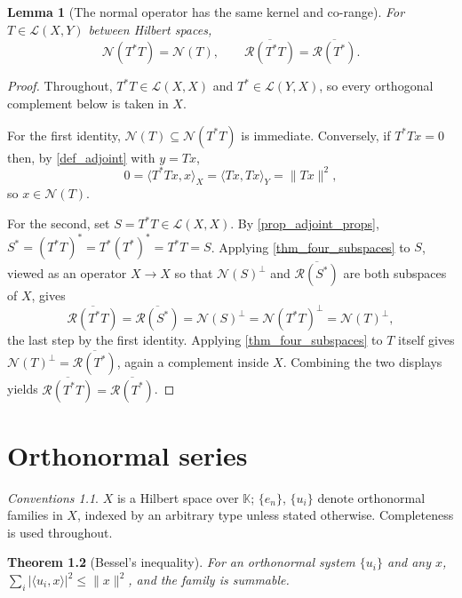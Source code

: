 \documentclass[a4paper]{report}
\theoremstyle{plain}
\newtheorem{theorem}{Theorem}[chapter]
\newtheorem{lemma}[theorem]{Lemma}
\theoremstyle{definition}
\theoremstyle{remark}
\newtheorem{assumptions}[theorem]{Conventions}
\begin{document}
\begin{lemma}[The normal operator has the same kernel and co-range]
  \label{lem_kernel_normal}
  For $T \in \mathcal{L}(X,Y)$ between Hilbert spaces,
  \[
    \mathcal{N}(T^*T) = \mathcal{N}(T),
    \qquad
    \overline{\mathcal{R}(T^*T)} = \overline{\mathcal{R}(T^*)} .
  \]
\end{lemma}
\begin{proof}
  Throughout, $T^*T \in \mathcal{L}(X,X)$ and $T^* \in \mathcal{L}(Y,X)$, so every
  orthogonal complement below is taken in $X$.

  For the first identity, $\mathcal{N}(T) \subseteq \mathcal{N}(T^*T)$ is immediate.
  Conversely, if $T^*Tx = 0$ then, by \cref{def_adjoint} with $y = Tx$,
  \[
    0 = \langle T^*Tx, x\rangle_X = \langle Tx, Tx\rangle_Y = \|Tx\|^2 ,
  \]
  so $x \in \mathcal{N}(T)$.

  For the second, set $S = T^*T \in \mathcal{L}(X,X)$.  By \cref{prop_adjoint_props},
  $S^* = (T^*T)^* = T^*(T^*)^* = T^*T = S$.  Applying \cref{thm_four_subspaces} to $S$,
  viewed as an operator $X \to X$ so that $\mathcal{N}(S)^\perp$ and
  $\overline{\mathcal{R}(S^*)}$ are both subspaces of $X$, gives
  \[
    \overline{\mathcal{R}(T^*T)} = \overline{\mathcal{R}(S^*)}
      = \mathcal{N}(S)^\perp = \mathcal{N}(T^*T)^\perp = \mathcal{N}(T)^\perp ,
  \]
  the last step by the first identity.  Applying \cref{thm_four_subspaces} to $T$ itself
  gives $\mathcal{N}(T)^\perp = \overline{\mathcal{R}(T^*)}$, again a complement inside
  $X$.  Combining the two displays yields
  $\overline{\mathcal{R}(T^*T)} = \overline{\mathcal{R}(T^*)}$.
\end{proof}



\chapter{Orthonormal series}
\label{ch_04_orthonormal_series}

\begin{assumptions}
  \label{asm_orthonormal_series}
  $X$ is a Hilbert space over $\mathbb{K}$;
$\{e_n\}$, $\{u_i\}$ denote orthonormal families in $X$, indexed by an arbitrary type
unless stated otherwise.  Completeness is used throughout.
\end{assumptions}

\begin{theorem}[Bessel's inequality]
  \label{thm_bessel}
  For an orthonormal system $\{u_i\}$ and any $x$,
  $\sum_i |\langle u_i,x\rangle|^2 \le \|x\|^2$, and the family is summable.
\end{theorem}
\end{document}
